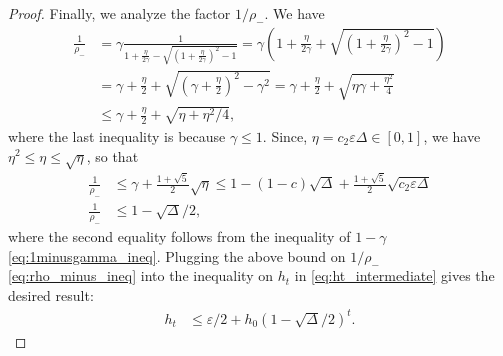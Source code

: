 \documentclass[10pt,a4paper]{amsart}
\begin{document}
\begin{proof}
  Finally, we analyze the factor $1/\rho_-$. We have
  \begin{align*}
    \frac{1}{\rho_-} & = \gamma \frac{1}{1 + \frac{\eta}{2\gamma} - \sqrt{\left(1 + \frac{\eta}{2\gamma}\right)^2 - 1}} = \gamma \left(1 + \frac{\eta}{2\gamma} + \sqrt{\left(1 + \frac{\eta}{2\gamma}\right)^2 - 1}\right) \\
    & = \gamma + \frac{\eta}{2} + \sqrt{\left( \gamma + \frac{\eta}{2}\right)^2 - \gamma ^2} = \gamma  + \frac{\eta}{2} + \sqrt{\eta \gamma + \frac{\eta^2}{4}} \\
    & \leqslant \gamma + \frac{\eta}{2} + \sqrt{\eta + \eta^2 / 4},
  \end{align*}
  where the last inequality is because $\gamma \leqslant 1$. Since, $\eta = c_2 \varepsilon \Delta \in [0,1]$, we have $\eta^2 \leqslant \eta \leqslant \sqrt{\eta}$, so that
  \begin{align}
    \frac{1}{\rho_-} & \leqslant \gamma + \frac{1 + \sqrt{5}}{2}\sqrt{\eta} \leqslant 1 - (1 - c)\sqrt{\Delta} + \frac{1 + \sqrt{5}}{2}\sqrt{c_2 \varepsilon \Delta} \nonumber\\
    \frac{1}{\rho_-} & \leqslant  1 - \sqrt{\Delta}/2 \label{eq:rho_minus_ineq},
  \end{align}
  where the second equality follows from the inequality of $1-\gamma$ \eqref{eq:1minusgamma_ineq}. Plugging the above bound on $1/\rho_-$ \eqref{eq:rho_minus_ineq} into the inequality on $h_t$ in \eqref{eq:ht_intermediate} gives the desired result:
  \begin{align*}
    h_t & \leqslant \varepsilon/2 + h_0 \left(1 - \sqrt{\Delta}/2\right)^t.
  \end{align*}
\end{proof}
\end{document}

